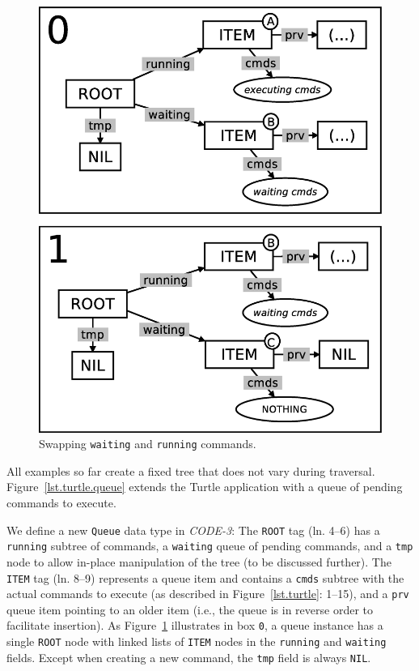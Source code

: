 \documentclass{sig-alternate}
\newcommand{\code}[1] {{\small{\texttt{#1}}}}
\begin{document}
\setcounter{figure}{8}
\begin{figure}[h!]
\centering
\includegraphics[scale=0.24]{queue-fig-1.eps}
\caption{
Swapping \code{waiting} and \code{running} commands.
\label{fig.queue-1}
}
\end{figure}

All examples so far create a fixed tree that does not vary during traversal.
%
Figure~\ref{lst.turtle.queue} extends the Turtle application with a queue of 
pending commands to execute.

We define a new \code{Queue} data type in \emph{CODE-3}:
The \code{ROOT} tag (ln. 4--6) has a \code{running} subtree of commands, a 
\code{waiting} queue of pending commands, and a \code{tmp} node to allow 
in-place manipulation of the tree (to be discussed further).
%
The \code{ITEM} tag (ln. 8--9) represents a queue item and contains a 
\code{cmds} subtree with the actual commands to execute (as described in 
Figure~\ref{lst.turtle}: 1--15), and a \code{prv} queue item pointing to an 
older item (i.e., the queue is in reverse order to facilitate insertion).
%
As Figure~\ref{fig.queue-1} illustrates in box \code{0}, a queue instance has a 
single \code{ROOT} node with linked lists of \code{ITEM} nodes in the 
\code{running} and \code{waiting} fields.
Except when creating a new command, the \code{tmp} field is always \code{NIL}.
\end{document}
